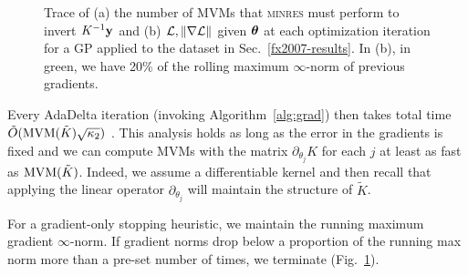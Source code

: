 \documentclass{article}
\begin{document}
\begin{figure}[!h]
\begin{center}
\end{center}
\caption{Trace of (a) the number of MVMs that \textsc{minres} must perform to invert $K^{-1}\textbf{y}$ and (b) $\mathcal{L}, \left\| \nabla\mathcal{L} \right\|$ given ${\boldsymbol\theta}$ at each optimization iteration for a GP applied to the dataset in Sec.~\ref{fx2007-results}. In (b), in green, we have 20\% of the rolling maximum $\infty$-norm of previous gradients.
}
\label{fx2007-iterations}
\end{figure}

Every AdaDelta iteration (invoking Algorithm~\ref{alg:grad}) then takes total time $\tilde{O}(\operatorname{MVM}(\tilde{K})\sqrt{\kappa_2})$ \cite{raykar2007fast}. This analysis holds as long as the error in the gradients is fixed and we can compute MVMs with the matrix $\partial_{\theta_j}K$ for each $j$ at least as fast as $\operatorname{MVM}({\tilde{K}})$. Indeed, we assume a differentiable kernel and then recall that applying the linear operator $\partial_{\theta_j}$ will maintain the structure of $\tilde{K}$.

For a gradient-only stopping heuristic, we maintain the running maximum gradient $\infty$-norm. If gradient norms drop below a proportion of the running max norm more than a pre-set number of times, we terminate (Fig.~\ref{fx2007-iterations}).
\end{document}
